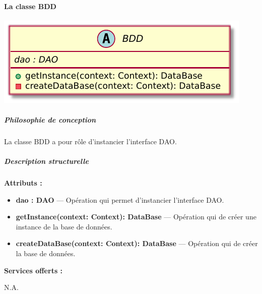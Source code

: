 \paragraph{La classe BDD}


\begin{minipage}
    {\linewidth}
    \centering
    \includegraphics[width=0.30\linewidth]{../schemas/Conception_detaillee/classe_bdd.pdf}
\end{minipage}
\subparagraph{Philosophie de conception \newline} 

\medspace

La classe BDD a pour rôle d'instancier l'interface DAO.  

\subparagraph{Description structurelle \newline}

\medspace

\textbf{Attributs :}

\begin{itemize}
    \item \textbf{dao : DAO} --- Opération qui permet d'instancier l'interface DAO. 
    \item \textbf{getInstance(context: Context): DataBase} --- Opération qui de créer une instance de la base de données.
    \item \textbf{createDataBase(context: Context): DataBase} --- Opération qui de créer la base de données. 
\end{itemize}

\textbf{Services offerts :}

N.A.


